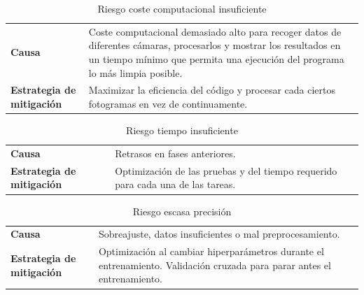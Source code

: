 \documentclass[12pt,a4paper,onecolumn,oneside]{report}
\begin{document}
\begin{table}[ht]
    \centering
    \caption{Riesgo coste computacional insuficiente}
    \begin{tabularx}{1\textwidth}{| >{\centering\arraybackslash}X | >{\centering\arraybackslash}X |}
        \hline
        \multicolumn{2}{|c|}{\textbf{R5}}\\
        \hline 
        \textbf{Causa} &  Coste computacional demasiado alto para recoger datos de diferentes cámaras, procesarlos y mostrar los resultados en un tiempo mínimo que permita una ejecución del programa lo más limpia posible.\\
        \hline 
        \textbf{Estrategia de mitigación} & Maximizar la eficiencia del código y procesar cada ciertos fotogramas en vez de continuamente.\\
        \hline
    \end{tabularx}
    \label{R5}
\end{table}

\begin{table}[ht]
    \centering
    \caption{Riesgo tiempo insuficiente}
    \begin{tabularx}{1\textwidth}{| >{\centering\arraybackslash}X | >{\centering\arraybackslash}X |}
        \hline
        \multicolumn{2}{|c|}{\textbf{R6}}\\
        \hline 
        \textbf{Causa} &  Retrasos en fases anteriores.\\
        \hline 
        \textbf{Estrategia de mitigación} & Optimización de las pruebas y del tiempo requerido para cada una de las tareas.\\
        \hline
    \end{tabularx}
    \label{R6}
\end{table}

\begin{table}[ht]
    \centering
    \caption{Riesgo escasa precisión}
    \begin{tabularx}{1\textwidth}{| >{\centering\arraybackslash}X | >{\centering\arraybackslash}X |}
        \hline
        \multicolumn{2}{|c|}{\textbf{R7}}\\
        \hline 
        \textbf{Causa} &  Sobreajuste, datos insuficientes o mal preprocesamiento.\\
        \hline 
        \textbf{Estrategia de mitigación} & Optimización al cambiar hiperparámetros durante el entrenamiento. Validación cruzada para parar antes el entrenamiento.\\
        \hline
    \end{tabularx}
    \label{R7}
\end{table}
\end{document}

